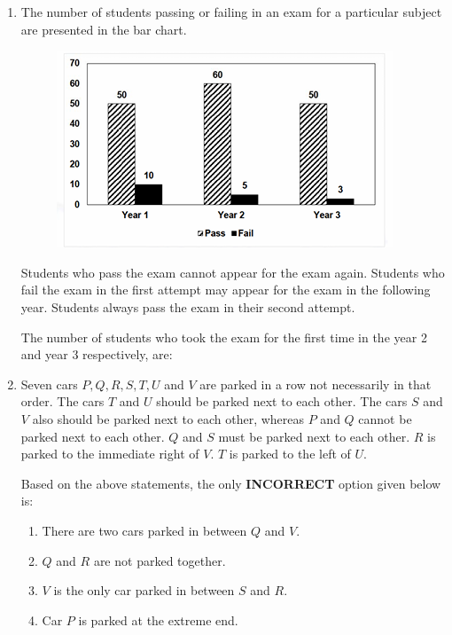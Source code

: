\documentclass[journal,12pt,onecolumn]{IEEEtran}
\theoremstyle{remark}
\begin{document}
\begin{flushleft}
\begin{enumerate}
\item The number of students passing or failing in an exam for a particular subject are presented in the bar chart.  
\begin{figure}[H]
    \centering
    \includegraphics[width=0.5\columnwidth]{figs/9.png}
    \caption{}
    \label{fig:placeholder}
\end{figure}
Students who pass the exam cannot appear for the exam again. Students who fail the exam in the first attempt may appear for the exam in the following year. Students always pass the exam in their second attempt.  

The number of students who took the exam for the first time in the year 2 and year 3 respectively, are:
\begin{enumerate}
\end{enumerate}







\item Seven cars $P, Q, R, S, T, U$ and $V$ are parked in a row not necessarily in that order.  
The cars $T$ and $U$ should be parked next to each other.  
The cars $S$ and $V$ also should be parked next to each other, whereas $P$ and $Q$ cannot be parked next to each other.  
$Q$ and $S$ must be parked next to each other.  
$R$ is parked to the immediate right of $V$.  
$T$ is parked to the left of $U$.  

Based on the above statements, the only \textbf{INCORRECT} option given below is:

\begin{enumerate}
\item There are two cars parked in between $Q$ and $V$.
\item $Q$ and $R$ are not parked together.
\item $V$ is the only car parked in between $S$ and $R$.
\item Car $P$ is parked at the extreme end.
\end{enumerate}






\end{enumerate}
\end{flushleft}
\end{document}
